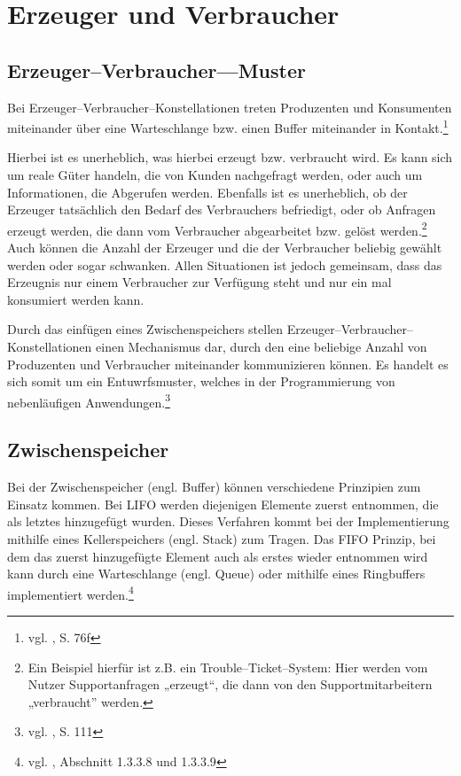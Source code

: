 
\section{Erzeuger und Verbraucher} %
\label{sec:erzeuger_und_verbraucher}

\subsection{Erzeuger–Verbraucher—Muster} %
\label{sub:erzeuger_verbraucher_muster}

Bei Erzeuger–Verbraucher–Konstellationen treten Produzenten und Konsumenten miteinander über eine Warteschlange bzw. einen Buffer miteinander in Kontakt.\footnote{vgl. \cite{osdi}, S. 76f}

Hierbei ist es unerheblich, was hierbei erzeugt bzw. verbraucht wird. Es kann sich um reale Güter handeln, die von Kunden nachgefragt werden, oder auch um Informationen, die Abgerufen werden. Ebenfalls ist es unerheblich, ob der Erzeuger tatsächlich den Bedarf des Verbrauchers befriedigt, oder ob Anfragen erzeugt werden, die dann vom Verbraucher abgearbeitet bzw. gelöst werden.\footnote{Ein Beispiel hierfür ist z.B. ein Trouble–Ticket–System: Hier werden vom Nutzer Supportanfragen „erzeugt“, die dann von den Supportmitarbeitern „verbraucht” werden.} 
Auch können die Anzahl der Erzeuger und die der Verbraucher beliebig gewählt werden oder sogar schwanken. Allen Situationen ist jedoch gemeinsam, dass das Erzeugnis nur einem Verbraucher zur Verfügung steht und nur ein mal konsumiert werden kann.

Durch das einfügen eines Zwischenspeichers stellen Erzeuger–Verbraucher–Konstellationen einen Mechanismus dar, 
durch den eine beliebige Anzahl von Produzenten und Verbraucher miteinander kommunizieren können.
Es handelt es sich somit um ein Entuwrfsmuster, welches in der Programmierung von nebenläufigen Anwendungen.\footnote{vgl. \cite{openmp}, S. 111} 


\subsection{Zwischenspeicher} %
\label{sub:buffer}

Bei der Zwischenspeicher (engl. Buffer) können verschiedene Prinzipien zum Einsatz kommen. Bei \ac{LIFO} werden diejenigen Elemente zuerst entnommen, die als letztes hinzugefügt wurden. Dieses Verfahren kommt bei der Implementierung mithilfe eines Kellerspeichers (engl. Stack) zum Tragen.  Das \ac{FIFO} Prinzip, bei dem das zuerst hinzugefügte Element auch als erstes wieder entnommen wird kann durch eine Warteschlange (engl. Queue) oder mithilfe eines Ringbuffers implementiert werden.\footnote{vgl. \cite{algorithms}, Abschnitt 1.3.3.8 und 1.3.3.9}

